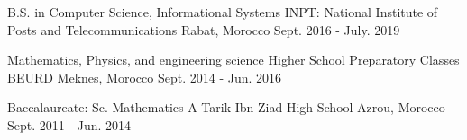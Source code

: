 

\begin{cventries}

  \cvedu
    {B.S. in Computer Science, Informational Systems} %
    {INPT: National Institute of Posts and Telecommunications} %
    {Rabat, Morocco} %
    {Sept. 2016 - July. 2019} %
    {}

  \cvedu
    {Mathematics, Physics, and engineering science} %
    {Higher School Preparatory Classes} %
    {BEURD Meknes, Morocco} %
    {Sept. 2014 - Jun. 2016} %
    {}

  \cvedu
    {Baccalaureate: Sc. Mathematics A} %
    {Tarik Ibn Ziad High School} %
    {Azrou, Morocco} %
    {Sept. 2011 - Jun. 2014} %
    {}

\end{cventries}

